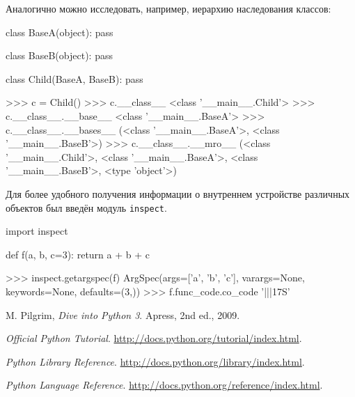 Аналогично можно исследовать, например, иерархию наследования классов:
\begin{pylst}{}{}
class BaseA(object):
    pass

class BaseB(object):
    pass

class Child(BaseA, BaseB):
    pass

>>> c = Child()
>>> c.__class__
<class '__main__.Child'>
>>> c.__class__.__base__
<class '__main__.BaseA'>
>>> c.__class__.__bases__
(<class '__main__.BaseA'>, <class '__main__.BaseB'>)
>>> c.__class__.__mro__
(<class '__main__.Child'>,
 <class '__main__.BaseA'>,
 <class '__main__.BaseB'>,
 <type 'object'>)
\end{pylst}

Для более удобного получения информации о внутреннем устройстве различных объектов был введён модуль \lstinline{inspect}.
\begin{pylst}{}{}
import inspect

def f(a, b, c=3):
    return a + b + c

>>> inspect.getargspec(f)
ArgSpec(args=['a', 'b', 'c'], varargs=None, keywords=None, defaults=(3,))
>>> f.func_code.co_code
'|||\x17S'
\end{pylst}

\begin{thebibliography}{9}

  M. Pilgrim,
  \emph{Dive into Python 3}.
  Apress,
  2nd ed.,
  2009.

  \emph{Official Python Tutorial}.
  \url{http://docs.python.org/tutorial/index.html}.

  \emph{Python Library Reference}.
  \url{http://docs.python.org/library/index.html}.

  \emph{Python Language Reference}.
  \url{http://docs.python.org/reference/index.html}.

\end{thebibliography}
